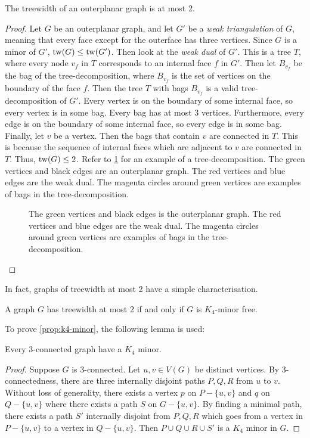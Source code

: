 \begin{proposition}\label{ex:tw_outerplanar}
	The treewidth of an outerplanar graph is at most 2.
\end{proposition}
\begin{proof}
	Let \(G\) be an outerplanar graph, and let \(G'\) be a \textit{weak triangulation} of \(G\), meaning that every face except for the outerface has three vertices. Since \(G\) is a minor of \(G'\), \(\operatorname{tw}(G) \leq \operatorname{tw}(G')\). Then look at the \textit{weak dual} of \(G'\). This is a tree \(T\), where every node \(v_f\) in \(T\) corresponds to an internal face \(f\) in \(G'\). Then let \(B_{v_f}\) be the bag of the tree-decomposition, where \(B_{v_f}\) is the set of vertices on the boundary of the face \(f\). Then the tree \(T\) with bags \(B_{v_f}\) is a valid tree-decomposition of \(G'\). Every vertex is on the boundary of some internal face, so every vertex is in some bag. Every bag has at most 3 vertices. Furthermore, every edge is on the boundary of some internal face, so every edge is in some bag. Finally, let $v$ be a vertex. Then the bags that contain $v$ are connected in $T$. This is because the sequence of internal faces which are adjacent to $v$ are connected in $T$. Thus, \(\operatorname{tw}(G) \leq 2\). Refer to \cref{fig:outerplanar_treedecomp} for an example of a tree-decomposition. The green vertices and black edges are an outerplanar graph. The red vertices and blue edges are the weak dual. The magenta circles around green vertices are examples of bags in the tree-decomposition.
	\begin{figure}[h!]
		\centering
		
		\caption[Tree-decomposition of outerplanar graph.]{ The green vertices and black edges is the outerplanar graph. The red vertices and blue edges are the weak dual. The magenta circles around green vertices are examples of bags in the tree-decomposition.}\label{fig:outerplanar_treedecomp}
	\end{figure}
\end{proof}

In fact, graphs of treewidth at most 2 have a simple characterisation.

\begin{proposition}\label{prop:k4-minor}
	A graph $G$ has treewidth at most 2 if and only if $G$ is $K_4$-minor free. 
\end{proposition}

To prove \cref{prop:k4-minor}, the following lemma is used:
\begin{lemma}
	Every $3$-connected graph have a $K_4$ minor. 
\end{lemma}
\begin{proof}
	Suppose $G$ is $3$-connected. Let $u, v \in V(G)$ be distinct vertices. By $3$-connectedness, there are three internally disjoint paths $P, Q, R$ from $u$ to $v$. Without loss of generality, there exists a vertex $p$ on $P -\{u, v\}$ and $q$ on $Q -\{u, v\}$ where there exists a path $S$ on $G - \{u, v\}$. By finding a minimal path, there exists a path $S'$ internally disjoint from $P, Q, R$ which goes from a vertex in $P - \{u, v\}$ to a vertex in $Q - \{u, v\}$. Then $P \cup Q \cup R \cup S'$ is a $K_4$ minor in $G$. 
\end{proof}

